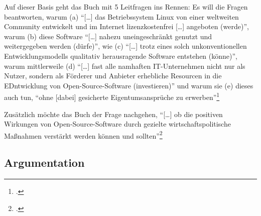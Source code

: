 \documentclass[DIV=calc,BCOR=5mm,11pt,headings=small,oneside,abstract=true, toc=bib]{scrartcl}
\begin{document}
Auf dieser Basis geht das Buch mit 5 Leitfragen ins Rennen: Es will die Fragen
beantworten, warum (a) \enquote{[\ldots] das Betriebssystem Linux von einer
weltweiten Community entwickelt und im Internet lizenzkostenfrei [\ldots]
angeboten (werde)}, warum (b) diese Software \enquote{[\ldots] nahezu
uneingeschränkt genutzt und weitergegeben werden (dürfe)}, wie (c)
\enquote{[\ldots] trotz eines solch unkonventionellen Entwicklungsmodells
qualitativ herausragende Software entstehen (könne)}, warum mittlerweile
(d) \enquote{[\ldots] fast alle namhaften IT-Unternehmen nicht nur als
Nutzer, sondern als Förderer und Anbieter erhebliche Resourcen in die
EDntwicklung von Open-Source-Software (investieren)} und warum sie
(e) dieses auch tun, \enquote{ohne [dabei] gesicherte Eigentumsansprüche zu
erwerben}\footcite[vgl.][3]{Mundhenke2007a}

Zusätzlich möchte das Buch der Frage nachgehen, \enquote{[\ldots] ob die
positiven Wirkungen von Open-Source-Software durch gezielte
wirtschaftspolitische Maßnahmen verstärkt werden können und
sollten}\footcite[vgl.][3]{Mundhenke2007a}

\subsection{Argumentation}
\end{document}
